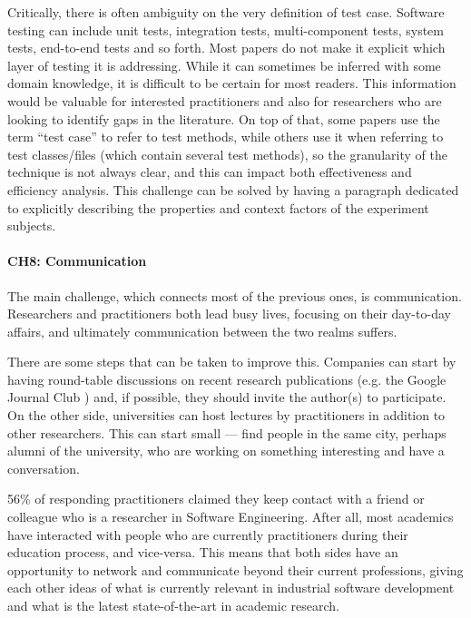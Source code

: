 Critically, there is often ambiguity on the very definition of test case.
Software testing can include unit tests, integration tests, multi-component tests, system tests, end-to-end tests and so forth.
Most papers do not make it explicit which layer of testing it is addressing. While it can sometimes be inferred with some domain knowledge, it is difficult to be certain for most readers.
This information would be valuable for interested practitioners and also for researchers who are looking to identify gaps in the literature.
On top of that, some papers use the term ``test case'' to refer to test methods, while others use it when referring to test classes/files (which contain several test methods), so the granularity of the technique is not always clear, and this can impact both effectiveness and efficiency analysis.
This challenge can be solved by having a paragraph dedicated to explicitly describing the properties and context factors of the experiment subjects.

\paragraph{CH8: Communication}
The main challenge, which connects most of the previous ones, is communication.
Researchers and practitioners both lead busy lives, focusing on their day-to-day affairs, and ultimately communication between the two realms suffers.

There are some steps that can be taken to improve this.
Companies can start by having round-table discussions on recent research publications (e.g. the Google Journal Club \cite{googlejournal}) and, if possible, they should invite the author(s) to participate.
On the other side, universities can host lectures by practitioners in addition to other researchers.
This can start small — find people in the same city, perhaps alumni of the university, who are working on something interesting and have a conversation.

56\% of responding practitioners claimed they keep contact with a friend or colleague who is a researcher in Software Engineering.
After all, most academics have interacted with people who are currently practitioners during their education process, and vice-versa.
This means that both sides have an opportunity to network and communicate beyond their current professions, giving each other ideas of what is currently relevant in industrial software development and what is the latest state-of-the-art in academic research.

